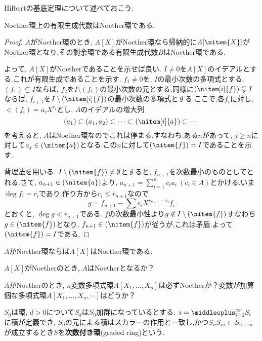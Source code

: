 Hilbertの基底定理について述べておこう.
\begin{thm}[Hilbertの基底定理]\label{thm:Hilbertの基底定理}
		Noether環上の有限生成代数はNoether環である.
	\end{thm}
	\begin{proof}
		$A$がNoether環のとき, $A[X]$がNoether環なら帰納的に$A[\nitem{X}]$がNoether環となり,その剰余環である有限生成代数$B$はNoether環である.
		
		よって, $A[X]$がNoetherであることを示せば良い. $I\neq0$を$A[X]$のイデアルとする.これが有限生成であることを示す. $f_1\neq0$を, $I$の最小次数の多項式とする. $(f_1)\subsetneq I$ならば, $f_2$を$I\setminus(f_1)$の最小次数の元とする.同様に$(\nitem[i]{f})\subsetneq I$ならば, $f_{i+1}$を$I\setminus(\nitem[i]{f})$の最小次数の多項式とする.ここで,各$f_i$に対し, $\lt(f_i)=a_iX^{r_i}$とし, $A$のイデアルの増大列
		\[(a_1)\subset(a_1,a_2)\subset\dots\subset(\nitem[i]{a})\subset\cdots\]
		を考えると, $A$はNoether環なのでこれは停まる.すなわち,ある$n$があって, $j\geq n$に対して$a_j\in(\nitem{a})$となる.この$n$に対して$(\nitem{f})=I$であることを示す.
		
		背理法を用いる. $I\setminus(\nitem{f})\neq\emptyset$とすると, $f_{n+1}$を次数最小のものとしてとれる.さて, $a_{n+1}\in(\nitem{a})$より, $a_{n+1}=\sum_{i=1}^n c_ia_i~(c_i\in A)$とかける.いま$\deg{f_i}=r_i$であり,作り方から$r_i\leq r_{n+1}$なので
		\[g=f_{n+1}-\sum c_iX^{r_{n+1}-r_i}f_i\]
		とおくと, $\deg g<r_{n+1}$である. $f$の次数最小性より$g\not\in I\setminus(\nitem{f})$すなわち$g\in(\nitem{f})$となり, $f_{n+1}\in(\nitem{f})$が従うが,これは矛盾.よって$(\nitem{f})=I$である.
\end{proof}

\begin{cor}
	$A$がNoether環ならば$A[X]$はNoether環である.
\end{cor}

\begin{exer}
	$A[X]$がNoetherのとき, $A$はNoetherとなるか？
\end{exer}

\begin{exer}
	$A$がNoetherのとき, $n$変数多項式環$A[X_1,\dots,X_n]$は必ずNoetherか？変数が加算個な多項式環$A[X_1,\dots,X_n,\cdots]$はどうか？
\end{exer}

\begin{defi}[次数付き環]
	$S_0$は環, $d>0$について$S_d$は$S_0$加群になっているとする. $s=\middleoplus_{i=0}^\infty S_i$に積が定義でき, $S_0$の元による積はスカラーの作用と一致し,かつ$S_nS_m\subset S_{n+m}$が成立するとき$S$を\textbf{次数付き環}(graded ring)という.
\end{defi}

